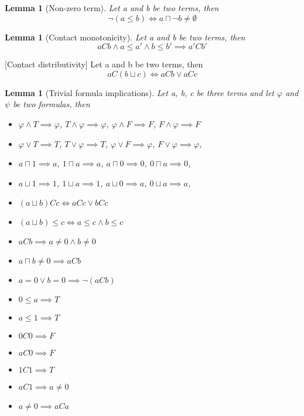 \documentclass{article}
\newtheorem{lemma}[theorem]{Lemma}
\begin{document}
\begin{lemma}[Non-zero term]
	Let a and b be two terms, then
	\begin{equation*}
		\neg(a \le b) \iff a \sqcap \neg b \neq \emptyset
	\end{equation*}
\end{lemma}

\begin{lemma}[Contact monotonicity]
	Let a and b be two terms, then
	\begin{equation*}
		aCb \land a \leq a' \land b \le b' \implies a'Cb'
	\end{equation*}
\end{lemma}[Contact distributivity]
	Let a and b be two terms, then
	\begin{equation*}
		aC(b \sqcup c) \iff aCb \lor aCc
	\end{equation*}
\begin{lemma}[Trivial formula implications]
	Let a, b, c be three terms and let $\varphi$ and $\psi$ be two formulas, then
	\begin{itemize}
		\item $\varphi \land T \implies \varphi$,\;\; $T \land \varphi \implies \varphi$,\;\;
		      $\varphi \land F \implies F$,\;\; $F \land \varphi \implies F$
		\item $\varphi \lor T \implies T$,\;\; $T \lor \varphi \implies T$,\;\;
		      $\varphi \lor F \implies \varphi$,\;\; $F \lor \varphi \implies \varphi$,
		\item $a \sqcap 1 \implies a$,\;\; $1 \sqcap a \implies a$,\;\;
		      $a \sqcap 0 \implies 0$,\;\; $0 \sqcap a \implies 0$,
		\item $a \sqcup 1 \implies 1$,\;\; $1 \sqcup a \implies 1$,\;\;
		      $a \sqcup 0 \implies a$,\;\; $0 \sqcup a \implies a$,
		\item $(a \sqcup b)Cc \iff aCc \lor bCc$
		\item $(a \sqcup b) \leq c \iff a \leq c \land b \leq c$
		\item $aCb \implies a \neq 0 \land b \neq 0$
		\item $a \sqcap b \neq 0 \implies aCb$
		\item $a = 0 \lor b = 0 \implies \neg(aCb)$
		\item $0 \leq a \implies T$
		\item $a \leq 1 \implies T$
		\item $0C0 \implies F$
		\item $aC0 \implies F$
		\item $1C1 \implies T$
		\item $aC1 \implies a \neq 0$
		\item $a \neq 0 \implies aCa$
	\end{itemize}
\end{lemma}
\end{document}
